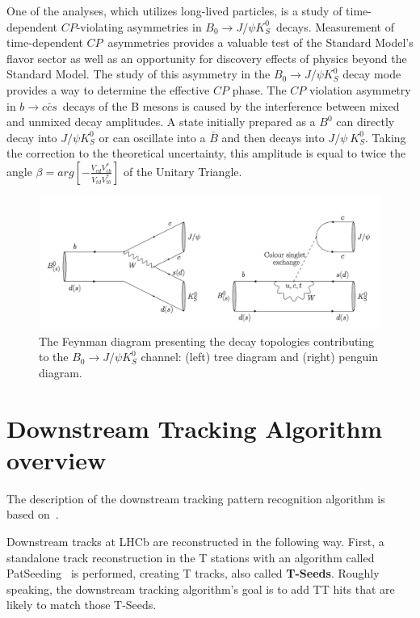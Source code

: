 One of the analyses, which utilizes long-lived particles, is a study of time-dependent $CP$-violating asymmetries in $B_0 \rightarrow J/\psi K_S^0$~decays. Measurement of time-dependent $CP$~asymmetries provides a valuable test of the Standard Model's flavor sector as well as an opportunity for discovery effects of physics beyond the Standard Model.  
 The study of this asymmetry in the $B_0 \rightarrow J/\psi K_S^0 $  decay mode provides a way to determine the effective $CP$ phase. The $CP$ violation asymmetry in $b \rightarrow c\bar{c}s$~decays of the B mesons is caused by the interference between mixed and unmixed decay amplitudes.
 A state initially prepared as a $B^0$ can directly decay into $J/\psi K_S^0$ or can oscillate into a $\bar{B}$ and then decays into  $J/\psi~K_S^0$. Taking the correction to the theoretical uncertainty, this amplitude is equal to twice the angle $\beta = arg [ -  \frac{V_{cd}V_{cb}^*}{V_{td}V_{tb}^*} ] $ of the Unitary Triangle.

\begin{figure}[h]
\centering
\includegraphics[width=\textwidth]{figures/B0JPKs.png}
\caption{The Feynman diagram presenting the decay topologies contributing to the $B_0 \rightarrow J/\psi K_S^0 $ channel:  (left) tree diagram and (right) penguin diagram.
\label{fig:BJPSi}}
\end{figure}

\section{Downstream Tracking Algorithm overview}
\label{Sec:Downstrean Overview}
The description of the downstream tracking pattern recognition algorithm is based on~\cite{PATLLT}. 

Downstream tracks at LHCb are reconstructed in the following way. First, a standalone track reconstruction in the T stations with an algorithm called PatSeeding~\cite{PatSeeding} is performed, creating T tracks, also called \textbf{T-Seeds}. 
Roughly speaking, the downstream tracking algorithm's goal is to add TT hits that are likely to match those T-Seeds. 

